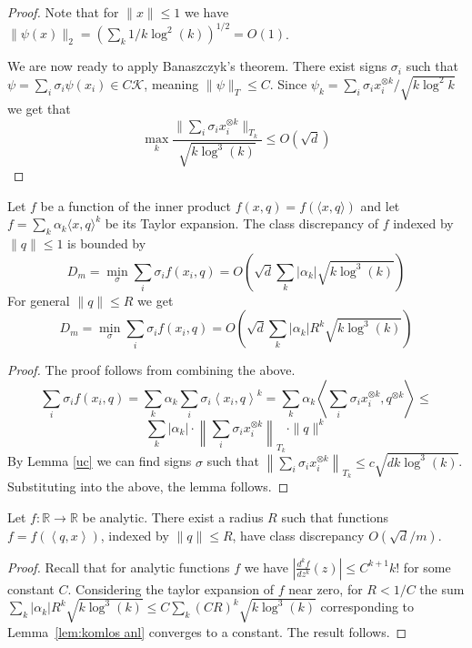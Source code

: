 \documentclass[anon,12pt]{colt2019} %
\newcommand{\ip}[1]{\left \langle #1 \right \rangle}
\newcommand{\R}{\mathbb{R}}
\begin{document}
{\begin{proof}
\noindent Note that for $\|x\| \le 1$ we have $\|\psi(x)\|_2 = (\sum_k  1/k\log^2(k))^{1/2} = O(1)$.


We are now ready to apply Banaszczyk's theorem. 
There exist signs $\sigma_i$ such that $\psi  = \sum_i \sigma_i \psi(x_i) \in C \mathcal K$, meaning $\|\psi\|_T \leq C$.
Since $\psi_k = \sum_i \sigma_i x_i^{\otimes k}/\sqrt{k \log^2{k}}$ we get that 
$$\max_k \frac{\|\sum_i \sigma_i  x_i^{\otimes k}\|_{T_k}}{\sqrt{k \log^{3}(k)}} \le O\left( \sqrt{d} \right)$$
\end{proof}

\begin{lemma} \label{lem:komlos anl}
Let $f$ be a function of the inner product $f(x,q) = f(\langle x,q\rangle)$ and let $f = \sum_k \alpha_k \langle x,q\rangle^k$ be its Taylor expansion. 
The class discrepancy of $f$ indexed by $\|q\| \leq 1$ is bounded by
\[
D_m = \min_\sigma \sum_i \sigma_i f(x_i,q) =O\left( \sqrt{d} \sum_k  |\alpha_k|\sqrt{k\log^3(k)}\right)
\]
For general $\|q\| \leq R$ we get
\[
D_m = \min_\sigma \sum_i \sigma_i f(x_i,q) =O\left( \sqrt{d} \sum_k  |\alpha_k| R^k \sqrt{ k\log^3(k)}\right)
\]
\end{lemma}
\begin{proof}
The proof follows from combining the above.
$$
\sum_i \sigma_i f(x_i,q) = \sum_k \alpha_k \sum_i \sigma_i \ip{ x_i,q}^k =  \sum_k \alpha_k  \ip{  \sum_i \sigma_i x_i^{\otimes k},q^{\otimes k}} \le $$
$$\sum_k |\alpha_k| \cdot \left\| \sum_i \sigma_i x_i^{\otimes k}\right\|_{T_k} \cdot \|q\|^k
$$
By Lemma \ref{uc} we can find signs $\sigma$ such that 
$\left\| \sum_i \sigma_i x_i^{\otimes k}\right\|_{T_k} \le c\sqrt{d k \log^3(k)}$. Substituting into the above, the lemma follows.
\end{proof}

\begin{theorem}\label{analitic1}
Let $f:\R\rightarrow\R$ be analytic. There exist a radius $R$ such that functions $f = f(\ip{q,x})$, indexed by $\|q\| \leq R$, have class discrepancy $O(\sqrt{d}/m)$. 
\end{theorem}
\begin{proof}
Recall that for analytic functions $f$ we have $\left| \frac{d^k f}{dz^k}(z) \right|  \leq C^{k+1} k! $
for some constant $C$. Considering the taylor expansion of $f$ near zero, for $R < 1/C$ the sum
$ \sum_k  |\alpha_k| R^k \sqrt{ k\log^3(k)} \leq C \sum_k  (CR)^k \sqrt{ k\log^3(k)}$
corresponding to Lemma~\ref{lem:komlos anl} converges to a constant. The result follows.
\end{proof}

}
\end{document}

